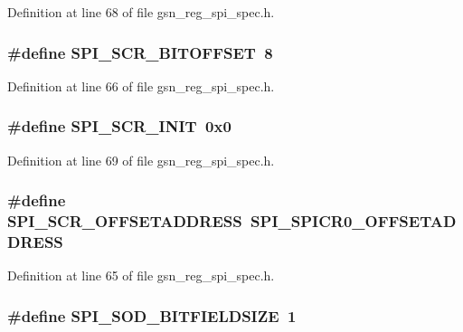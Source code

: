 Definition at line 68 of file gsn\_\-reg\_\-spi\_\-spec.h.

\hypertarget{a00573_ad72d2de8f2f7eba1a9dd20711243d5d3}{
\subsubsection[{SPI\_\-SCR\_\-BITOFFSET}]{\setlength{\rightskip}{0pt plus 5cm}\#define SPI\_\-SCR\_\-BITOFFSET~8}}
\label{a00573_ad72d2de8f2f7eba1a9dd20711243d5d3}


Definition at line 66 of file gsn\_\-reg\_\-spi\_\-spec.h.

\hypertarget{a00573_a960fc9adfb8e83c5541a9ed076d5a5f0}{
\subsubsection[{SPI\_\-SCR\_\-INIT}]{\setlength{\rightskip}{0pt plus 5cm}\#define SPI\_\-SCR\_\-INIT~0x0}}
\label{a00573_a960fc9adfb8e83c5541a9ed076d5a5f0}


Definition at line 69 of file gsn\_\-reg\_\-spi\_\-spec.h.

\hypertarget{a00573_a470e780a538c1454dd736ac01cf610bc}{
\subsubsection[{SPI\_\-SCR\_\-OFFSETADDRESS}]{\setlength{\rightskip}{0pt plus 5cm}\#define SPI\_\-SCR\_\-OFFSETADDRESS~SPI\_\-SPICR0\_\-OFFSETADDRESS}}
\label{a00573_a470e780a538c1454dd736ac01cf610bc}


Definition at line 65 of file gsn\_\-reg\_\-spi\_\-spec.h.

\hypertarget{a00573_af0423b1aac41b57d501f48c72eabb6b9}{
\subsubsection[{SPI\_\-SOD\_\-BITFIELDSIZE}]{\setlength{\rightskip}{0pt plus 5cm}\#define SPI\_\-SOD\_\-BITFIELDSIZE~1}}
\label{a00573_af0423b1aac41b57d501f48c72eabb6b9}


